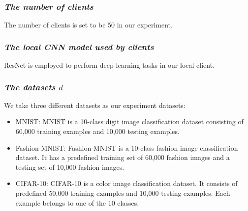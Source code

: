 \documentclass[journal]{IEEEtran}
\begin{document}
  \subsubsection{{\textit{The number of clients}}} The number of clients is set to be 50 in our experiment.
  \subsubsection{{\textit{The local CNN model used by clients}}} ResNet is employed to perform deep learning tasks in our local client.
  \subsubsection{{\textit{The datasets {$d$}}}} We take three different datasets as our experiment datasets: \begin{itemize}
      \item MNIST: MNIST is a 10-class digit image classification dataset consisting of 60,000 training examples and 10,000 testing examples.
      \item Fashion-MNIST: Fashion-MNIST is a 10-class fashion image classification dataset. It has a predefined training set of 60,000 fashion images and a testing set of 10,000 fashion images.
      \item CIFAR-10: CIFAR-10 is a color image classification dataset. It consists of predefined 50,000 training examples and 10,000 testing examples. Each example belongs to one of the 10 classes.
  \end{itemize} 
\end{document}
